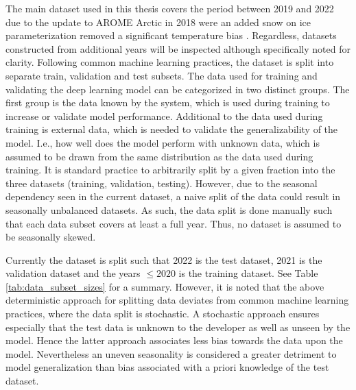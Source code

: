 \documentclass[../main/thesis]{subfiles}
\begin{document}
The main dataset used in this thesis covers the period between 2019 and 2022 due to the update to AROME Arctic in 2018 were an added snow on ice parameterization removed a significant temperature bias \citep{Batrak2019}. Regardless, datasets constructed from additional years will be inspected although specifically noted for clarity. Following common machine learning practices, the dataset is split into separate train, validation and test subsets. The data used for training and validating the deep learning model can be categorized in two distinct groups. The first group is the data known by the system, which is used during training to increase or validate model performance. Additional to the data used during training is external data, which is needed to validate the generalizability of the model. I.e., how well does the model perform with unknown data, which is assumed to be drawn from the same distribution as the data used during training. It is standard practice to arbitrarily split by a given fraction into the three datasets (training, validation, testing). However, due to the seasonal dependency seen in the current dataset, a naive split of the data could result in seasonally unbalanced datasets. As such, the data split is done manually such that each data subset covers at least a full year. Thus, no dataset is assumed to be seasonally skewed.

Currently the dataset is split such that 2022 is the test dataset, 2021 is the validation dataset and the years $\leq2020$ is the training dataset. See Table \ref{tab:data_subset_sizes} for a summary. However, it is noted that the above deterministic approach for splitting data deviates from common machine learning practices, where the data split is stochastic. A stochastic approach ensures especially that the test data is unknown to the developer as well as unseen by the model. Hence the latter approach associates less bias towards the data upon the model. Nevertheless an uneven seasonality is considered a greater detriment to model generalization than bias associated with a priori knowledge of the test dataset.
\end{document}
